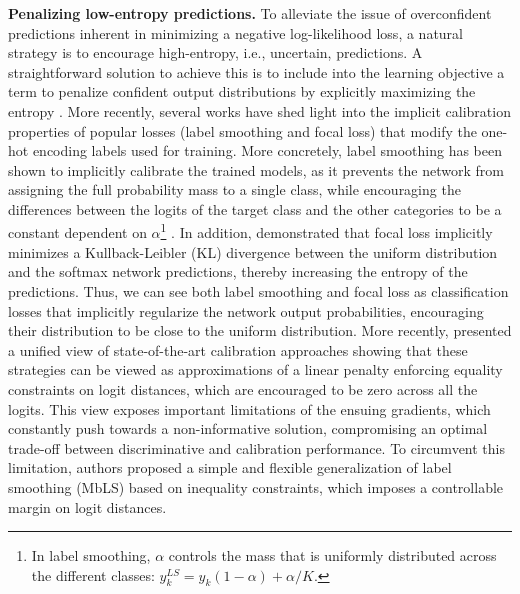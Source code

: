 \documentclass[twocolumn,final,10pt]{elsarticle}
\newcommand{\rev}[1]{{\color{black}#1}}
\begin{document}
\rev{\noindent \textbf{Penalizing low-entropy predictions.} To alleviate the issue of overconfident predictions inherent in minimizing a negative log-likelihood loss, a natural strategy is to encourage high-entropy, i.e., uncertain, predictions. A straightforward solution to achieve this is to include into the learning objective a term to penalize confident output distributions by explicitly maximizing the entropy \citep{pereyra2017regularizing}. More recently, several works \citep{muller2019does,mukhoti2020calibrating} have shed light into the implicit calibration properties of popular losses (label smoothing and focal loss) that modify the one-hot encoding labels used for training. More concretely, label smoothing \citep{szegedy2016rethinking} has been shown to implicitly calibrate the trained models, as it prevents the network from assigning the full probability mass to a single class, while encouraging the differences between the logits of the target class and the other categories to be a constant dependent on $\alpha$\footnote{In label smoothing, $\alpha$ controls the mass that is uniformly distributed across the different classes: $y^{LS}_k=y_k (1-\alpha)+\alpha/K$.} \citep{muller2019does}. In addition, \citep{mukhoti2020calibrating} demonstrated that focal loss \citep{lin2017focal} implicitly minimizes a Kullback-Leibler (KL) divergence between the uniform distribution and the softmax network predictions, thereby increasing the entropy of the predictions. Thus, we can see both label smoothing and focal loss as classification losses that implicitly regularize the network output probabilities, encouraging their distribution to be close to the uniform distribution. More recently, \citep{liu2022devil} presented a unified view of state-of-the-art calibration approaches \citep{pereyra2017regularizing,szegedy2016rethinking,lin2017focal} %
showing that these strategies can be viewed as approximations of a linear penalty enforcing equality constraints on logit distances, which are encouraged to be zero across all the logits. This view exposes important limitations of the ensuing gradients, which constantly push towards a non-informative solution, compromising an optimal trade-off between discriminative and calibration performance. To circumvent this limitation, authors proposed a simple and flexible generalization of label smoothing (MbLS) based on inequality constraints, which imposes a controllable margin on logit distances. }
\end{document}
